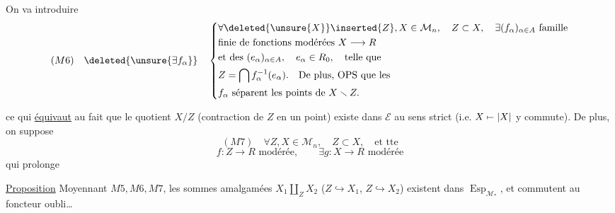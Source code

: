 On va introduire
\[
(M6)\quad\deleted{\unsure{\exists f_\alpha}}\quad
\left\{\begin{aligned}
&\forall \deleted{\unsure{X}}\inserted{Z},X\in\mathcal M_n,\quad Z\subset X,\quad\exists(f_\alpha)_{\alpha\in A}\ \text{famille}\\
&\text{finie de fonctions modérées }X\longrightarrow R\\
&\text{et des }(e_\alpha)_{\alpha\in A},\quad e_\alpha\in R_0,\quad\text{telle que}\\
&Z=\bigcap f_\alpha^{-1}(e_\alpha).\quad\text{De plus, OPS que les}\\
&f_\alpha\text{ séparent les points de }X\smallsetminus Z.
\end{aligned}\right.
\]




ce qui \uline{équivaut} au fait que le quotient $X/Z$ (contraction de $Z$ en un point) existe dans $\mathcal E$ au sens strict (i.e. $X\mathrel{\mapstochar\relbar}|X|$ y commute). De plus, on suppose
\[
(M7)\quad\forall Z,X\in\mathcal M_n,\quad Z\subset X,\quad\text{et tte}
\]
\[
f:Z\longrightarrow R\text{ modérée},\qquad\exists g:X\longrightarrow R\text{ modérée}
\]
qui prolonge 

\uline{Proposition} Moyennant $M5,M6,M7$, les sommes amalgamées $X_1\amalg_Z X_2$ ($Z\hookrightarrow X_1$, $Z\hookrightarrow X_2$) existent dans $\operatorname{Esp}_{\mathcal M_*}$, et commutent au foncteur oubli\ldots
{}
